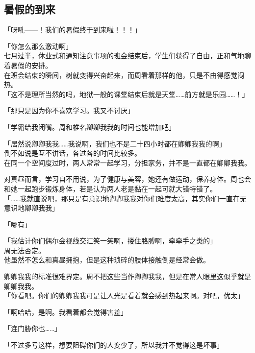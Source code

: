 \subsection{暑假的到来}

「呀吼——！我们的暑假终于到来啦！！！」

「你怎么那么激动啊」\\

七月过半，休业式和通知注意事项的班会结束后，学生们获得了自由，正和气地聊着暑假的安排。\\

在班会结束的瞬间，树就变得兴奋起来，而周看着那样的他，只是不由得感觉闷热。\\

「这不是理所当然的吗，地狱一般的课堂结束后就是天堂……前方就是乐园……！」

「那只是因为你不喜欢学习。我又不讨厌」

「学霸给我闭嘴。周和椎名卿卿我我的时间也能增加吧」

「居然说卿卿我我……我说啊，我们也不是二十四小时都在卿卿我我的啊」\\

倒不如说是互不讲话，各过各的时间比较多。\\

在同一个空间度过时，两人常常一起学习，分担家务，并不是一直都在卿卿我我。

对真昼而言，学习自不用说，为了健康与美容，她还有做运动，保养身体。周也会和她一起跑步锻炼身体，若是认为两人老是黏在一起可就大错特错了。\\

「……我就直说吧，那只是有意识地卿卿我我对你们难度太高，其实你们一直在无意识地卿卿我我」

「哪有」

「我估计你们偶尔会视线交汇笑一笑啊，搂住胳膊啊，牵牵手之类的」\\

周无法否定。\\

他虽然不怎么和真昼拥抱，但是这种琐碎的肢体接触倒是经常会做。

卿卿我我的标准很难界定。周不把这些当作卿卿我我，但是在常人眼里这似乎就是卿卿我我。\\

「你看吧。你们的卿卿我我可是让人光是看着就会感到热起来啊。对吧，优太」

「啊哈哈，是啊。我看着都会觉得害羞」

「连门胁你也……」

「不过多亏这样，想要阻碍你们的人变少了，所以我并不觉得这是坏事」\\

